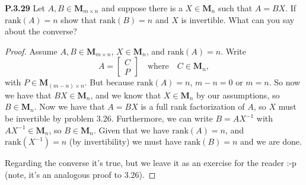 \documentclass[12pt]{amsart}
\begin{document}
\begin{onehalfspace}
        \noindent\textbf{P.3.29} Let $A,B\in\mathbf{M}_{m\times n}$ and suppose there is a $X\in\mathbf{M}_n$ such that
        $A=BX$.
        If $\text{rank}(A)=n$ show that $\text{rank}(B)=n$ and $X$ is invertible.
        What can you say about the converse?
        \begin{proof}
            Assume $A,B\in\mathbf{M}_{m\times n}$, $X\in\mathbf{M}_n$, and $\text{rank}(A)=n$.
            Write
            \begin{displaymath}
                A = \left[\begin{matrix}C \\ P\end{matrix}\right] \quad\text{where}\quad C\in\textbf{M}_n,
            \end{displaymath}
            with $P\in\mathbf{M}_{(m-n)\times n}$.
            But because $\text{rank}(A) = n$, $m-n=0$ or $m=n$.
            So now we have that $BX\in\mathbf{M}_n$, and we know that $X\in\mathbf{M}_n$ by our assumptions, so $
            B\in\mathbf{M}_n$.
            Now we have that $A=BX$ is a full rank factorization of $A$, so $X$ must be invertible by problem 3.26.
            Furthermore, we can write $B=AX^{-1}$ with $AX^{-1}\in\mathbf{M}_n$, so $B\in\mathbf{M}_n$.
            Given that we have $\text{rank}(A) = n$, and $\text{rank}(X^{-1})=n$ (by invertibility) we must have
            $\text{rank}(B) = n$ and we are done.

            Regarding the converse it's true, but we leave it as an exercise for the reader :-p (note, it's an
            analogous proof to 3.26).
        \end{proof}

    \end{onehalfspace}
\end{document}
